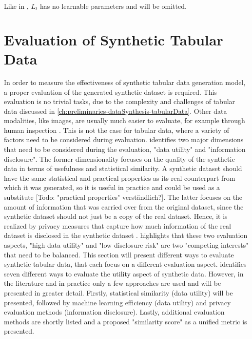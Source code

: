 Like in \cite{ho2020DenoisingDiffusionProbabilistic}, $L_{t}$ has no learnable parameters and will be omitted.


\section{Evaluation of Synthetic Tabular Data}
\label{ch:preliminaries-evaluationOfSyntheticTabularData}

In order to measure the effectiveness of synthetic tabular data generation model, a proper evaluation of the generated synthetic dataset is required.
This evaluation is no trivial tasks, due to the complexity and challenges of tabular data discussed in \autoref{ch:preliminaries-dataSynthesis-tabularData}.
Other data modalities, like images, are usually much easier to evaluate, for example through human inspection \cite{chundawat2022UniversalMetricRobust}. 
This is not the case for tabular data, where a variety of factors need to be considered during evaluation.
\cite{goncalves2020GenerationEvaluationSynthetic} identifies two major dimensions that need to be considered during the evaluation, "data utility" and "information disclosure".
The former dimensionality focuses on the quality of the synthetic data in terms of usefulness and statistical similarity.
A synthetic dataset should have the same statistical and practical properties as its real counterpart from which it was generated, so it is useful in practice and could be used as a substitute  [Todo: "practical properties" verständlich?].
The latter focuses on the amount of information that was carried over from the original dataset, since the synthetic dataset should not just be a copy of the real dataset.
Hence, it is realized by privacy measures that capture how much information of the real dataset is disclosed in the synthetic dataset \cite{goncalves2020GenerationEvaluationSynthetic}.
\cite[p. 2]{little2021GenerativeAdversarialNetworksa} highlights that these two evaluation aspects, "high data utility" and "low disclosure risk" are two "competing interests" that need to be balanced.
This section will present different ways to evaluate synthetic tabular data, that each focus on a different evaluation aspect.
\cite{elemam2020SevenWaysEvaluate} identifies seven different ways to evaluate the utility aspect of synthetic data.
However, in the literature and in practice only a few approaches are used and will be presented in greater detail.
Firstly, statistical similarity (data utility) will be presented, followed by machine learning efficiency (data utility) and privacy evaluation methods (information disclosure).
Lastly, additional evaluation methods are shortly listed and a proposed "similarity score" as a unified metric is presented.


